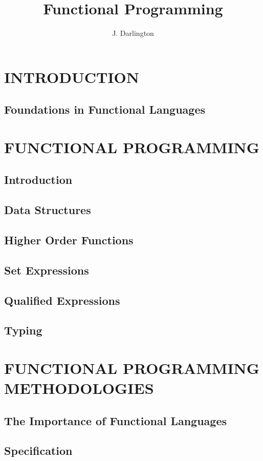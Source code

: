 \documentclass{article}
\title{Functional Programming}
\author{J. Darlington}
\date{}
\begin{document}
\maketitle

\tableofcontents

\section{INTRODUCTION}
\subsection{Foundations in Functional Languages}

\section{FUNCTIONAL PROGRAMMING}
\subsection{Introduction}
\subsection{Data Structures}
\subsection{Higher Order Functions}
\subsection{Set Expressions}
\subsection{Qualified Expressions}
\subsection{Typing}

\section{FUNCTIONAL PROGRAMMING METHODOLOGIES}
\subsection{The Importance of Functional Languages}
\subsection{Specification}
\end{document}
